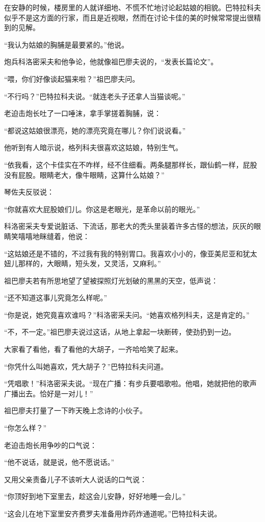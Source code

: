 在安静的时候，楼房里的人就详细地、不慌不忙地讨论起姑娘的相貌。巴特拉科夫似乎不是这方面的行家，而且是近视眼，然而在讨论卡佳的美的时候常常提出很精到的见解。

“我认为姑娘的胸脯是最要紧的。”他说。

炮兵科洛密采夫和他争论，他就像祖巴廖夫说的，“发表长篇论文”。

“喂，你们好像谈起猫来啦？”祖巴廖夫问。

“不行吗？”巴特拉科夫说。“就连老头子还拿人当猫谈呢。”

老迫击炮长吐了一口唾沫，拿手掌搓着胸脯，说：

“都说这姑娘很漂亮，她的漂亮究竟在哪儿？你们说说看。”

他听到有人暗示说，格列科夫很喜欢这姑娘，特别生气。

“依我看，这个卡佳实在不咋样，经不住细看。两条腿那样长，跟仙鹤一样，屁股没有屁股。眼睛老大，像牛眼睛，这算什么姑娘？”

琴佐夫反驳说：

“你就喜欢大屁股娘们儿。你这是老眼光，是革命以前的眼光。”

科洛密采夫专爱说脏话、下流话，那老大的秃头里装着许多古怪的想法，灰灰的眼睛笑嘻嘻地眯缝着，他说：

“这姑娘还是不错的，不过我有我的特别胃口。我喜欢小小的，像亚美尼亚和犹太妞儿那样的，大眼睛，短头发，又灵活，又麻利。”

祖巴廖夫若有所思地望了望被探照灯光划破的黑黑的天空，低声说：

“还不知道这事儿究竟怎么样呢。”

“你是说，她究竟喜欢谁吗？”科洛密采夫问。“她喜欢格列科夫，这是肯定的。”

“不，不一定。”祖巴廖夫说过这话，从地上拿起一块断砖，使劲扔到一边。

大家看了看他，看了看他的大胡子，一齐哈哈笑了起来。

“你凭什么叫她喜欢，凭大胡子？”巴特拉科夫问道。

“凭唱歌！”科洛密采夫说。“现在广播：有步兵要唱歌啦。他唱，她就把他的歌声广播出去。恰好是一对儿！”

祖巴廖夫打量了一下昨天晚上念诗的小伙子。

“你怎么样？”

老迫击炮长用争吵的口气说：

“他不说话，就是说，他不愿说话。”

又用父亲责备儿子不该听大人说话的口气说：

“你顶好到地下室里去，趁这会儿安静，好好地睡一会儿。”

“这会儿在地下室里安齐费罗夫准备用炸药炸通道呢。”巴特拉科夫说。

